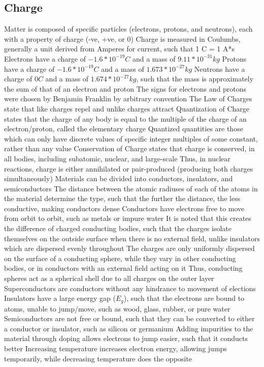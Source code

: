 \documentclass[11 pt, twoside]{article}
\newenvironment{outline*}
{
	\begin{outline}[enumerate]
	}
	{\end{outline}
}
\begin{document}
\subsection{Charge}
\begin{outline*}
\1 Matter is composed of specific particles (electrons, protons, and neutrons), each with a property of charge (-ve, +ve, or 0)
\2 Charge is measured in Coulumbs, generally a unit derived from Amperes for current, such that 1 C = 1 A*s
\2 Electrons have a charge of $-1.6*10^{-19} C$ and a mass of $9.11*10^{-31} kg$
\2 Protons have a charge of $-1.6*10^{-19} C$ and a mass of $1.673*10^{-27} kg$
\2 Neutrons have a charge of $0 C$ and a mass of $1.674*10^{-27} kg$, such that the mass is approximately the sum of that of an electron and proton
\2 The signs for electrons and protons were chosen by Benjamin Franklin by arbitrary convention
\1 The Law of Charges state that like charges repel and unlike charges attract
\1 Quantization of Charge states that the charge of any body is equal to the multiple of the charge of an electron/proton, called the elementary charge
\2 Quantized quantities are those which can only have discrete values of specific integer multiples of some constant, rather than any value
\1 Conservation of Charge states that charge is conserved, in all bodies, including subatomic, nuclear, and large-scale
\2 Thus, in nuclear reactions, charge is either annihilated or pair-produced (producing both charges simultaneously)
\1 Materials can be divided into conductors, insulators, and semiconductors
\2 The distance between the atomic radiuses of each of the atoms in the material determine the type, such that the further the distance, the less conductive, making conductors dense
\2 Conductors have electrons free to move from orbit to orbit, such as metals or impure water
\3 It is noted that this creates the difference of charged conducting bodies, such that the charges isolate themselves on the outside surface when there is no external field, unlike insulators which are dispersed evenly throughout
\4 The charges are only uniformly dispersed on the surface of a conducting sphere, while they vary in other conducting bodies, or in conductors with an external field acting on it
\3 Thus, conducting spheres act as a spherical shell due to all charges on the outer layer
\3 Superconductors are conductors without any hindrance to movement of elections
\2 Insulators have a large energy gap ($E_g$), such that the electrons are bound to atoms, unable to jump/move, such as wood, glass, rubber, or pure water
\2 Semiconductors are not free or bound, such that they can be converted to either a conductor or insulator, such as silicon or germanium
\3 Adding impurities to the material through doping allows electrons to jump easier, such that it conducts better
\3 Increasing temperature increases electron energy, allowing jumps temporarily, while decreasing temperature does the opposite
\end{outline*}
\end{document}
